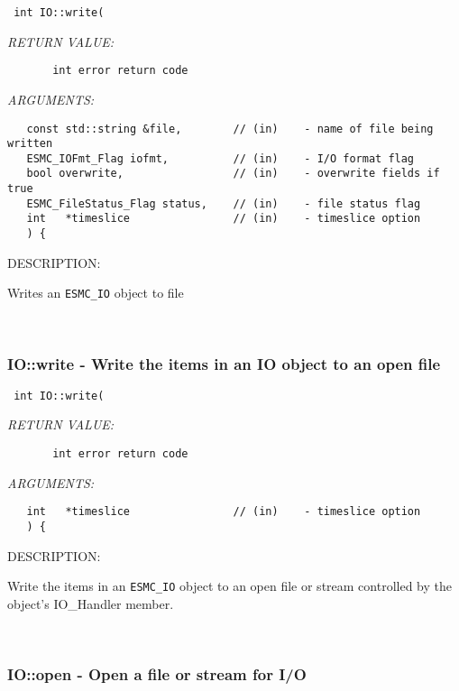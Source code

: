   
\begin{verbatim} int IO::write(\end{verbatim}{\em RETURN VALUE:}
\begin{verbatim}       int error return code\end{verbatim}{\em ARGUMENTS:}
\begin{verbatim}   const std::string &file,        // (in)    - name of file being written
   ESMC_IOFmt_Flag iofmt,          // (in)    - I/O format flag
   bool overwrite,                 // (in)    - overwrite fields if true
   ESMC_FileStatus_Flag status,    // (in)    - file status flag
   int   *timeslice                // (in)    - timeslice option
   ) {\end{verbatim}
{\sf DESCRIPTION:\\ }


        Writes an {\tt ESMC\_IO} object to file
   
 
\mbox{}\hrulefill\ 
 
\subsubsection [IO::write] {IO::write - Write the items in an IO object to an open file}


  
\begin{verbatim} int IO::write(\end{verbatim}{\em RETURN VALUE:}
\begin{verbatim}       int error return code\end{verbatim}{\em ARGUMENTS:}
\begin{verbatim} 
   int   *timeslice                // (in)    - timeslice option
   ) {\end{verbatim}
{\sf DESCRIPTION:\\ }


        Write the items in an {\tt ESMC\_IO} object to an open file or stream
        controlled by the object's IO_Handler member.
   
 
\mbox{}\hrulefill\ 
 
\subsubsection [IO::open] {IO::open - Open a file or stream for I/O}


